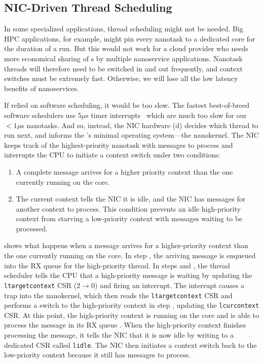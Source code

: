 \subsection{NIC-Driven Thread Scheduling}
\label{ssec:thread-scheduler}
In some specialized applications, thread scheduling might not be needed. Big HPC applications, for example, might pin every nanotask to a dedicated core for the duration of a run. But this would not work for a cloud provider who needs more economical sharing of \name{}s by multiple nanoservice applications.
Nanotask threads will therefore need to be switched in and out frequently, and context switches must be extremely fast. Otherwise, we will lose all the low latency benefits of nanoservices.

If \name{} relied on software scheduling, it would be too slow. 
The fastest best-of-breed software schedulers use 5$\mu$s timer interrupts~\cite{shinjuku, shenango} which are much too slow for our $<1\mu$s nanotasks.
And so, instead, the NIC hardware (d) decides which thread to run next, and informs the \name{}'s minimal operating system---the nanokernel. 
The NIC keeps track of the highest-priority nanotask with messages to process and interrupts the CPU to initiate a context switch under two conditions:

\begin{enumerate}[topsep=0.4\baselineskip, leftmargin=20pt]
    \item A complete message arrives for a higher priority context than the one currently running on the core.
    \item The current context tells the NIC it is idle, and the NIC has messages for another context to process. 
    This condition prevents an idle high-priority context from starving a low-priority context with messages waiting to be processed.
\end{enumerate}

 shows what happens when a message arrives for a higher-priority context than the one currently running on the core. 
In step , the arriving message is enqueued into the RX queue for the high-priority thread.
In steps  and , the thread scheduler tells the CPU that a high-priority message is waiting by updating the \verb|ltargetcontext| CSR ($2\rightarrow 0$) and firing an interrupt.
The interrupt causes a trap into the nanokernel, which then reads the \verb|ltargetcontext| CSR and performs a switch to the high-priority context in step , updating the \verb|lcurcontext| CSR.
At this point, the high-priority context is running on the core and is able to process the message in its RX queue .
When the high-priority context finishes processing the message, it tells the NIC that it is now idle by writing to a dedicated CSR called \verb|lidle|.
The NIC then initiates a context switch back to the low-priority context because it still has messages to process.

